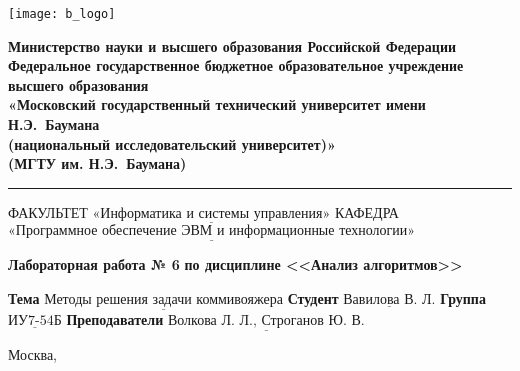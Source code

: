 \thispagestyle{empty}

\noindent \begin{minipage}{0.15\textwidth}
	\texttt{[image: b\_logo]}
\end{minipage}
\noindent\begin{minipage}{0.85\textwidth}\centering
	\textbf{Министерство науки и высшего образования Российской Федерации}\\
	\textbf{Федеральное государственное бюджетное образовательное учреждение высшего образования}\\
	\textbf{«Московский государственный технический университет имени Н.Э.~Баумана}\\
	\textbf{(национальный исследовательский университет)»}\\
	\textbf{(МГТУ им. Н.Э.~Баумана)}
\end{minipage}

\noindent\rule{\linewidth}{3pt}
\newline\newline
\noindent ФАКУЛЬТЕТ $\underline{\text{«Информатика и системы управления»}}$ \newline\newline
\noindent КАФЕДРА $\underline{\text{«Программное обеспечение ЭВМ и информационные технологии»}}$

\vspace{1cm}

\begin{center}
	\noindent\begin{minipage}{1.3\textwidth}\centering
		\Large\textbf{  Лабораторная работа № 6}\newline
		\textbf{по дисциплине <<Анализ алгоритмов>>}\newline\newline
	\end{minipage}
\end{center}

\noindent\textbf{Тема} $\underline{\text{Методы решения задачи коммивояжера}}$\newline\newline
\noindent\textbf{Студент} $\underline{\text{Вавилова В. Л.}}$\newline\newline
\noindent\textbf{Группа} $\underline{\text{ИУ7-54Б}}$\newline\newline
\noindent\textbf{Преподаватели} $\underline{\text{Волкова Л. Л., Строганов Ю. В.}}$\newline

\begin{center}
	\vfill
	Москва,~\the\year
\end{center}
\clearpage
